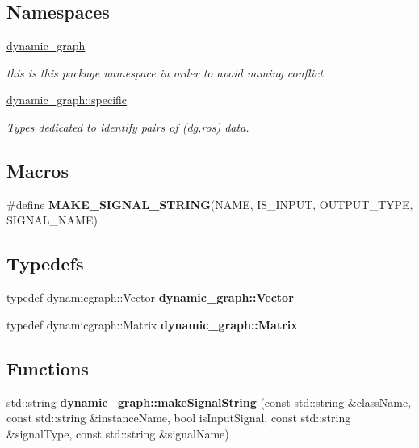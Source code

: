 \subsection*{Namespaces}
\begin{DoxyCompactItemize}
\item 
 \hyperlink{namespacedynamic__graph}{dynamic\+\_\+graph}
\begin{DoxyCompactList}\small\item\em this is this package namespace in order to avoid naming conflict \end{DoxyCompactList}\item 
 \hyperlink{namespacedynamic__graph_1_1specific}{dynamic\+\_\+graph\+::specific}
\begin{DoxyCompactList}\small\item\em Types dedicated to identify pairs of (dg,ros) data. \end{DoxyCompactList}\end{DoxyCompactItemize}
\subsection*{Macros}
\begin{DoxyCompactItemize}
\item 
\#define {\bfseries M\+A\+K\+E\+\_\+\+S\+I\+G\+N\+A\+L\+\_\+\+S\+T\+R\+I\+NG}(N\+A\+ME,  I\+S\+\_\+\+I\+N\+P\+UT,  O\+U\+T\+P\+U\+T\+\_\+\+T\+Y\+PE,  S\+I\+G\+N\+A\+L\+\_\+\+N\+A\+ME)
\end{DoxyCompactItemize}
\subsection*{Typedefs}
\begin{DoxyCompactItemize}
\item 
typedef dynamicgraph\+::\+Vector {\bfseries dynamic\+\_\+graph\+::\+Vector}\hypertarget{namespacedynamic__graph_a2df237966b015fea47c58c7778cc9a73}{}\label{namespacedynamic__graph_a2df237966b015fea47c58c7778cc9a73}

\item 
typedef dynamicgraph\+::\+Matrix {\bfseries dynamic\+\_\+graph\+::\+Matrix}\hypertarget{namespacedynamic__graph_a58a622fc51830acb132d3a3f18115374}{}\label{namespacedynamic__graph_a58a622fc51830acb132d3a3f18115374}

\end{DoxyCompactItemize}
\subsection*{Functions}
\begin{DoxyCompactItemize}
\item 
std\+::string {\bfseries dynamic\+\_\+graph\+::make\+Signal\+String} (const std\+::string \&class\+Name, const std\+::string \&instance\+Name, bool is\+Input\+Signal, const std\+::string \&signal\+Type, const std\+::string \&signal\+Name)\hypertarget{namespacedynamic__graph_a5e89dc0ac6a2d2c1368c7d4617585f6b}{}\label{namespacedynamic__graph_a5e89dc0ac6a2d2c1368c7d4617585f6b}

\end{DoxyCompactItemize}


